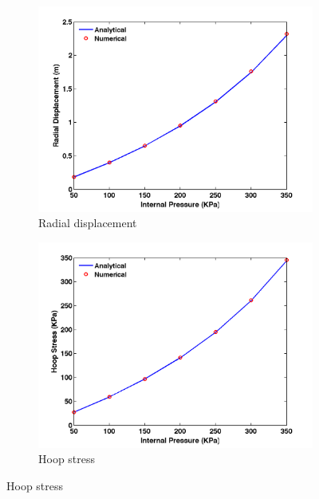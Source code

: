 \begin{figure}[H]
	\begin{subfigure}[b]{0.5\textwidth}
		\centering
		\includegraphics[width=\textwidth]{./figures/ur.png}
		\caption{Radial displacement}
		\label{ur}
	\end{subfigure}
	\begin{subfigure}[b]{0.5\textwidth}
		\centering
		\includegraphics[width=\textwidth]{./figures/hoop.png}
		\caption{Hoop stress}
		\label{hoop}
	\end{subfigure}
	

\end{figure}
